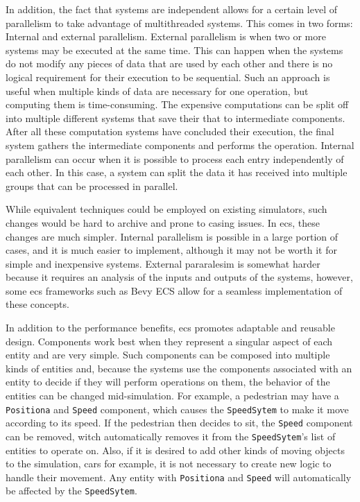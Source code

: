 \documentclass[twoside, 11pt]{article}
\begin{document}
In addition, the fact that systems are independent allows for a certain level of parallelism to take advantage of multithreaded systems. This comes in two forms: Internal and external parallelism. External parallelism is when two or more systems may be executed at the same time. This can happen when the systems do not modify any pieces of data that are used by each other and there is no logical requirement for their execution to be sequential. Such an approach is useful when multiple kinds of data are necessary for one operation, but computing them is time-consuming. The expensive computations can be split off into multiple different systems that save their that to intermediate components. After all these computation systems have concluded their execution, the final system gathers the intermediate components and performs the operation. Internal parallelism can occur when it is possible to process each entry independently of each other. In this case, a system can split the data it has received into multiple groups that can be processed in parallel.

While equivalent techniques could be employed on existing simulators, such changes would be hard to archive and prone to casing issues. In \gls{ecs}, these changes are much simpler. Internal parallelism is possible in a large portion of cases, and it is much easier to implement, although it may not be worth it for simple and inexpensive systems. External pararalesim is somewhat harder because it requires an analysis of the inputs and outputs of the systems, however, some \gls{ecs} frameworks such as Bevy ECS \cite{bevy} allow for a seamless implementation of these concepts.

In addition to the performance benefits, \gls{ecs} promotes adaptable and reusable design. Components work best when they represent a singular aspect of each entity and are very simple. Such components can be composed into multiple kinds of entities and, because the systems use the components associated with an entity to decide if they will perform operations on them, the behavior of the entities can be changed mid-simulation. For example, a pedestrian may have a \verb|Positiona| and \verb|Speed| component, which causes the \verb|SpeedSytem| to make it move according to its speed. If the pedestrian then decides to sit, the \verb|Speed| component can be removed, witch automatically removes it from the \verb|SpeedSytem|'s list of entities to operate on. Also, if it is desired to add other kinds of moving objects to the simulation, cars for example, it is not necessary to create new logic to handle their movement. Any entity with \verb|Positiona| and \verb|Speed| will automatically be affected by the \verb|SpeedSytem|.
\end{document}
